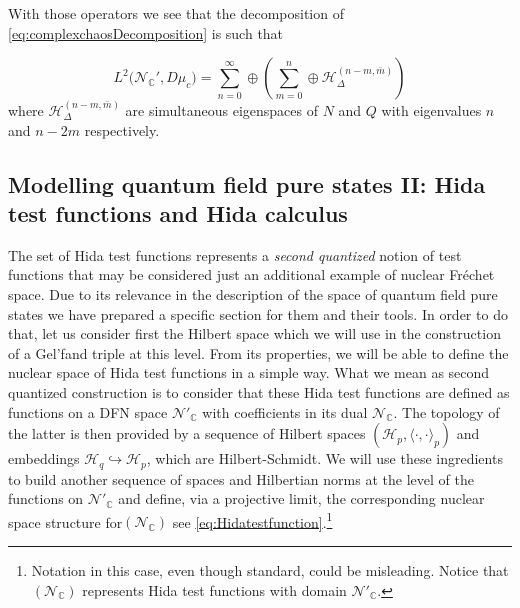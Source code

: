 \documentclass[12pt]{article}%
\begin{document}
With those operators we see that the decomposition of \eqref{eq:complexchaosDecomposition} is such that

\begin{equation}
\label{eq:descompositionCharge}
L^2\big({\mathcal{N}_{\mathbb{C}}'},D\mu_c\big)=\sum_{n=0}^\infty\oplus \left( \sum_{m=0}^n\oplus \mathcal{H}_\Delta^{(n-m,\bar{m})} \right)
\end{equation}
where $\mathcal{H}_\Delta^{(n-m,\bar{m})}$ are simultaneous eigenspaces of $N$ and $Q$ with eigenvalues $n$ and $n-2m$ respectively. 


\subsection{Modelling quantum field pure states II: Hida test functions and Hida calculus}
\label{sec:Hida}
The set of Hida test functions  represents a {\it second quantized} notion of test functions that may be considered just an additional example of nuclear Fréchet space. Due to its relevance in the description of the space of quantum field pure states we have prepared a specific section for them and their tools. In order to do that, let us consider first the Hilbert space which we will use in the construction of a Gel'fand triple at this level. From its properties, we will be able to define the nuclear space of Hida test functions in a simple way. What we mean as second quantized construction is to consider that these Hida test functions are defined as  functions on a DFN space $\mathcal{N}'_{\mathbb{C}}$ with coefficients in its dual $\mathcal{N}_{\mathbb{C}}$. The topology of the latter is then provided by a sequence of Hilbert spaces $(\mathcal{H}_p, \langle \cdot, \cdot \rangle_p)$ and embeddings $\mathcal{H}_q\hookrightarrow \mathcal{H}_p$, which are Hilbert-Schmidt. We will use these ingredients to build another sequence of spaces and Hilbertian norms at the level of the functions on $\mathcal{N}'_{\mathbb{C}}$ and define, via a projective limit, the corresponding nuclear space structure for$(\mathcal{N}_{\mathbb{C}})$ see \eqref{eq:Hidatestfunction}.\footnote{Notation in this case, even though standard, could be misleading. Notice  that $(\mathcal{N}_{\mathbb{C}})$ represents Hida test functions with domain $\mathcal{N}'_{\mathbb{C}}$. } 
\end{document}
